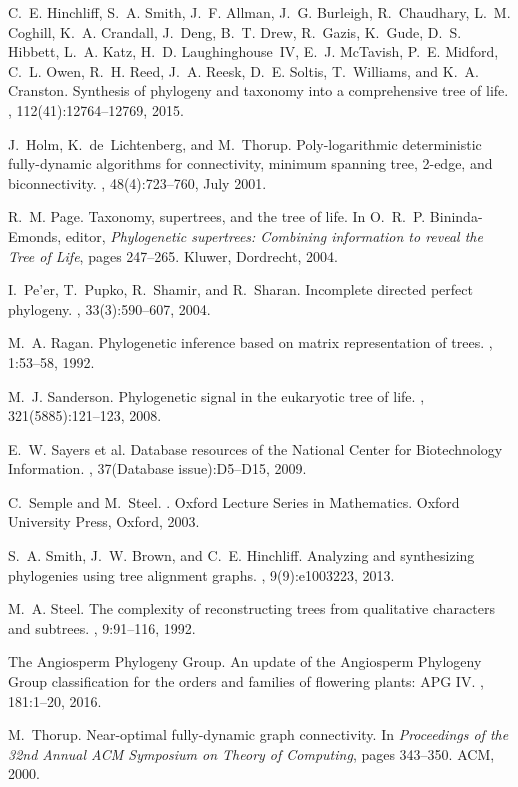 \documentclass[11pt]{article}
\theoremstyle{definition}
\begin{document}
\begin{thebibliography}{10}
C.~E. Hinchliff, S.~A. Smith, J.~F. Allman, J.~G. Burleigh, R.~Chaudhary, L.~M.
  Coghill, K.~A. Crandall, J.~Deng, B.~T. Drew, R.~Gazis, K.~Gude, D.~S.
  Hibbett, L.~A. Katz, H.~D. Laughinghouse~IV, E.~J. McTavish, P.~E. Midford,
  C.~L. Owen, R.~H. Reed, J.~A. Reesk, D.~E. Soltis, T.~Williams, and K.~A.
  Cranston.
\newblock Synthesis of phylogeny and taxonomy into a comprehensive tree of
  life.
,
  112(41):12764--12769, 2015.

J.~Holm, K.~de~Lichtenberg, and M.~Thorup.
\newblock Poly-logarithmic deterministic fully-dynamic algorithms for
  connectivity, minimum spanning tree, 2-edge, and biconnectivity.
, 48(4):723--760, July 2001.

R.~M. Page.
\newblock Taxonomy, supertrees, and the tree of life.
\newblock In O.~R.~P. Bininda-Emonds, editor, {\em Phylogenetic supertrees:
  Combining information to reveal the Tree of Life}, pages 247--265. Kluwer,
  Dordrecht, 2004.

I.~Pe'er, T.~Pupko, R.~Shamir, and R.~Sharan.
\newblock Incomplete directed perfect phylogeny.
, 33(3):590--607, 2004.

M.~A. Ragan.
\newblock Phylogenetic inference based on matrix representation of trees.
, 1:53--58, 1992.

M.~J. Sanderson.
\newblock Phylogenetic signal in the eukaryotic tree of life.
, 321(5885):121--123, 2008.

E.~W. {Sayers et al.}
\newblock Database resources of the {National Center for Biotechnology
  Information}.
, 37(Database issue):D5--D15, 2009.

C.~Semple and M.~Steel.
.
\newblock Oxford Lecture Series in Mathematics. Oxford University Press,
  Oxford, 2003.

S.~A. Smith, J.~W. Brown, and C.~E. Hinchliff.
\newblock Analyzing and synthesizing phylogenies using tree alignment graphs.
, 9(9):e1003223, 2013.

M.~A. Steel.
\newblock The complexity of reconstructing trees from qualitative characters
  and subtrees.
, 9:91--116, 1992.

{The Angiosperm Phylogeny Group}.
\newblock An update of the {Angiosperm Phylogeny Group} classification for the
  orders and families of flowering plants: {APG IV}.
, 181:1--20, 2016.

M.~Thorup.
\newblock Near-optimal fully-dynamic graph connectivity.
\newblock In {\em Proceedings of the 32nd Annual ACM Symposium on Theory of
  Computing}, pages 343--350. ACM, 2000.

\end{thebibliography}
\end{document}
